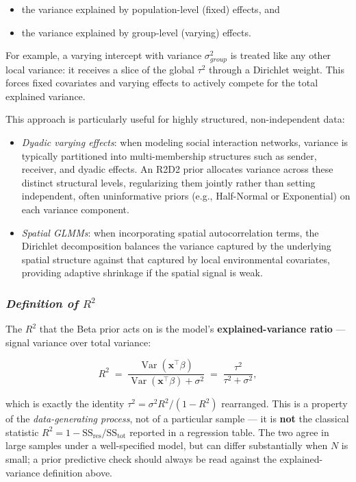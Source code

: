 \documentclass[
  letterpaper,
  DIV=11,
  numbers=noendperiod]{scrartcl}
\providecommand{\tightlist}{%
  \setlength{\itemsep}{0pt}\setlength{\parskip}{0pt}}\usepackage{longtable,booktabs,array}
\begin{document}
\begin{itemize}
\tightlist
\item
  the variance explained by population-level (fixed) effects, and
\item
  the variance explained by group-level (varying) effects.
\end{itemize}

For example, a varying intercept with variance \(\sigma_{group}^2\) is
treated like any other local variance: it receives a slice of the global
\(\tau^2\) through a Dirichlet weight. This forces fixed covariates and
varying effects to actively compete for the total explained variance.

This approach is particularly useful for highly structured,
non-independent data:

\begin{itemize}
\item
  \emph{Dyadic varying effects}: when modeling social interaction
  networks, variance is typically partitioned into multi-membership
  structures such as sender, receiver, and dyadic effects. An R2D2 prior
  allocates variance across these distinct structural levels,
  regularizing them jointly rather than setting independent, often
  uninformative priors (e.g., Half-Normal or Exponential) on each
  variance component.
\item
  \emph{Spatial GLMMs}: when incorporating spatial autocorrelation
  terms, the Dirichlet decomposition balances the variance captured by
  the underlying spatial structure against that captured by local
  environmental covariates, providing adaptive shrinkage if the spatial
  signal is weak.
\end{itemize}

\subsubsection{\texorpdfstring{\emph{Definition of
\(R^2\)}}{Definition of R\^{}2}}\label{sec-r2-definition}

The \(R^2\) that the Beta prior acts on is the model's
\textbf{explained-variance ratio} --- signal variance over total
variance:

\[
R^2 \;=\; \frac{\operatorname{Var}(\mathbf{x}^\top\beta)}{\operatorname{Var}(\mathbf{x}^\top\beta) + \sigma^2} \;=\; \frac{\tau^2}{\tau^2 + \sigma^2},
\]

which is exactly the identity \(\tau^2 = \sigma^2 R^2 / (1 - R^2)\)
rearranged. This is a property of the \emph{data-generating process},
not of a particular sample --- it is \textbf{not} the classical
statistic \(R^2 = 1 - \text{SS}_{\text{res}} / \text{SS}_{\text{tot}}\)
reported in a regression table. The two agree in large samples under a
well-specified model, but can differ substantially when \(N\) is small;
a prior predictive check should always be read against the
explained-variance definition above.
\end{document}
